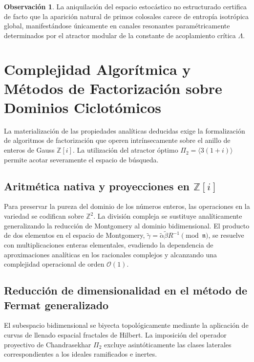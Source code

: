 \documentclass{article}
\numberwithin{equation}{section}
\theoremstyle{plain}
\theoremstyle{definition}
\newtheorem{observacion}[teorema]{Observación}
\begin{document}
\begin{observacion}
La aniquilación del espacio estocástico no estructurado certifica de facto que la aparición natural de primos colosales carece de entropía isotrópica global, manifestándose únicamente en canales resonantes paramétricamente determinados por el atractor modular de la constante de acoplamiento crítica $\Lambda$.
\end{observacion}

\section{Complejidad Algorítmica y Métodos de Factorización sobre Dominios Ciclotómicos}
\label{sec:implementacion}

La materialización de las propiedades analíticas deducidas exige la formalización de algoritmos de factorización que operen intrínsecamente sobre el anillo de enteros de Gauss $\mathbb{Z}[i]$. La utilización del atractor óptimo $\Pi_2 = \langle 3(1+i) \rangle$ permite acotar severamente el espacio de búsqueda.

\subsection{Aritmética nativa y proyecciones en \texorpdfstring{$\mathbb{Z}[i]$}{Z[i]}}

Para preservar la pureza del dominio de los números enteros, las operaciones en la variedad se codifican sobre $\mathbb{Z}^2$. La división compleja se sustituye analíticamente generalizando la reducción de Montgomery al dominio bidimensional. El producto de dos elementos en el espacio de Montgomery, $\tilde{\gamma} = \tilde{\alpha} \tilde{\beta} R^{-1} \pmod{\mathfrak{n}}$, se resuelve con multiplicaciones enteras elementales, evadiendo la dependencia de aproximaciones analíticas en los racionales complejos y alcanzando una complejidad operacional de orden $\mathcal{O}(1)$.

\subsection{Reducción de dimensionalidad en el método de Fermat generalizado}

El subespacio bidimensional se biyecta topológicamente mediante la aplicación de curvas de llenado espacial fractales de Hilbert. La imposición del operador proyectivo de Chandrasekhar $\Pi_2$ excluye asintóticamente las clases laterales correspondientes a los ideales ramificados e inertes. 
\end{document}
